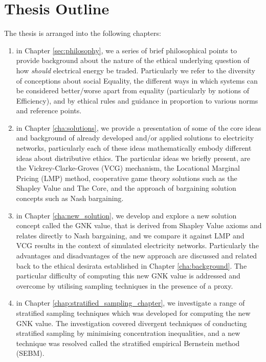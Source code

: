 \section{Thesis Outline}
The thesis is arranged into the following chapters:
\begin{enumerate}
\item in Chapter \ref{sec:philosophy}, we a series of brief philosophical points to provide background about the nature of the ethical underlying question of how \textit{should} electrical energy be traded. Particularly we refer to the diversity of conceptions about social Equality, the different ways in which systems can be considered better/worse apart from equality (particularly by notions of Efficiency), and by ethical rules and guidance in proportion to various norms and reference points. 
\item in Chapter \ref{cha:solutions}, we provide a presentation of some of the core ideas and background of already developed and/or applied solutions to electricity networks, particularly each of these ideas mathematically embody different ideas about distributive ethics. The particular ideas we briefly present, are the Vickrey-Clarke-Groves (VCG) mechanism, the Locational Marginal Pricing (LMP) method, cooperative game theory solutions such as the Shapley Value and The Core, and the approach of bargaining solution concepts such as Nash bargaining. 
\item in Chapter \ref{cha:new_solution}, we develop and explore a new solution concept called the GNK value, that is derived from Shapley Value axioms and relates directly to Nash bargaining, and we compare it against LMP and VCG results in the context of simulated electricity networks. Particularly the advantages and disadvantages of the new approach are discussed and related back to the ethical desirata established in Chapter \ref{cha:background}. The particular difficulty of computing this new GNK value is addressed and overcome by utilising sampling techniques in the presence of a proxy.
\item in Chapter \ref{chap:stratified_sampling_chapter}, we investigate a range of stratified sampling techniques which was developed for computing the new GNK value. The investigation covered divergent techniques of conducting stratified sampling by minimising concentration inequalities, and a new technique was resolved called the stratified empirical Bernstein method (SEBM).
\end{enumerate}




